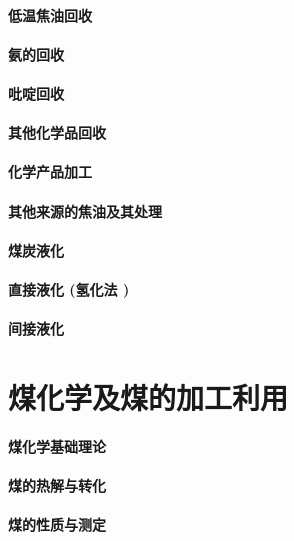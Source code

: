 \documentclass[UTF8]{../../ApplicationUniverse}
\begin{document}
        \subsubsection{低温焦油回收}
        \subsubsection{氨的回收}
        \subsubsection{吡啶回收}
        \subsubsection{其他化学品回收}
    \subsubsection{化学产品加工}
\subsubsection{其他来源的焦油及其处理}
\subsubsection{煤炭液化}
    \subsubsection{直接液化 (氢化法 )}
    \subsubsection{间接液化}









\chapter{煤化学及煤的加工利用}
\subsubsection{煤化学基础理论}
    \subsubsection{煤的热解与转化}
\subsubsection{煤的性质与测定}
\end{document}
